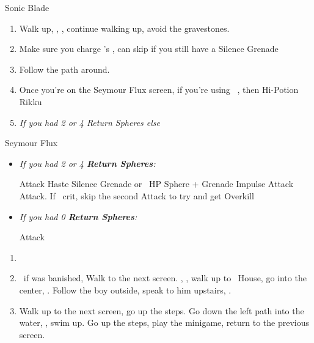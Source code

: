 \begin{multicols}{2}
\begin{equip}
  \begin{itemize}
    \auronf Sonic Blade
  \end{itemize}
\end{equip}
\begin{enumerate}[resume]
  \item Walk up, \sd, \cs[1:20], continue walking up, avoid the gravestones.
  \item Make sure you charge \rikku's \od, can skip if you still have a Silence Grenade
  \item Follow the path around.
  \item Once you're on the Seymour Flux screen, if you're using \rikku\ \od, then Hi-Potion Rikku
   \item \formation{\tidus}{\yuna}{\auron} \textit{If you had 2 or 4 Return Spheres else } \formation{\tidus}{\kimahri}{\wakka}
\end{enumerate}
\begin{battle}[70000]{Seymour Flux}
  \begin{itemize}
    \item \textit{If you had 2 or 4 \textbf{Return Spheres}:}
          \begin{itemize}
            \yunaf Attack
            \tidusf Haste \yuna
            \switch{\auron}{\rikku}
            \rikkuf Silence Grenade or \od\ HP Sphere + Grenade
            \summon{\bahamut}
            \bahamutf Impulse
            \yunaf Attack
            \tidusf Attack. If \yuna\ crit, skip the second Attack to try and get Overkill
          \end{itemize}
    \item \textit{If you had 0 \textbf{Return Spheres}:}
          \begin{itemize}
            \switch{\tidus}{\yuna}
            \summon{\bahamut}
            \bahamutf Attack
          \end{itemize}
  \end{itemize}
\end{battle}
\begin{enumerate}[resume]
  \item \formation{\tidus}{\kimahri}{\auron}
  \item \save\ if \bahamut was banished, Walk to the next screen. \skippablefmv[0:20], \sd, walk up to \tidus\ House, go into the center, \sd. Follow the boy outside, speak to him upstairs, \sd.
  \item Walk up to the next screen, go up the steps. Go down the left path into the water, \sd, swim up. Go up the steps, play the minigame, return to the previous screen.

\end{enumerate}
\end{multicols}
